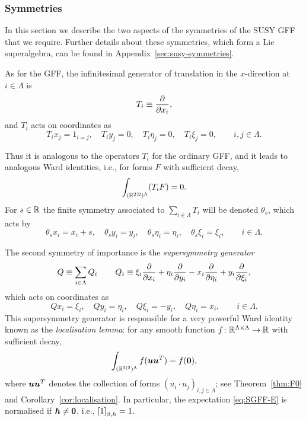 \documentclass[11pt,a4paper]{article}
\begin{document}
\subsubsection{Symmetries} 

In this section we describe the two aspects of the symmetries of the
SUSY GFF that we require. Further details about these symmetries,
which form a Lie superalgebra, can be found in
Appendix~\ref{sec:susy-symmetries}.

As for the GFF, the infinitesimal generator of translation in
the $x$-direction at $i\in\Lambda$ is
\begin{equation}
  T_i \equiv \frac{\partial }{\partial x_i},
\end{equation}
and $T_{i}$ acts on coordinates as
\begin{equation}
  T_ix_j = 1_{i = j},\quad T_iy_j = 0, \quad T_i\eta_j = 0,\quad
  T_i\xi_j = 0, \qquad i,j\in\Lambda.
\end{equation}

Thus it is analogous to the operators $T_i$ for the ordinary GFF, and
it leads to analogous Ward identities, i.e., for forms $F$ with
sufficient decay,
\begin{equation}
  \label{eq:IBP-SUSY-GFF}
  \int_{(\mathbb{R}^{2|2})^{\Lambda}} (T_{i}F) = 0.
\end{equation}
For $s\in \mathbb{R}$ the finite symmetry associated to
$\sum_{i\in\Lambda} T_i$ will be denoted $\theta_s$, which acts by
\begin{equation}
  \theta_s x_i = x_i+s,\quad\theta_s y_i = y_i, \quad \theta_s \eta_i = \eta_i,\quad \theta_s \xi_i = \xi_i,
  \qquad i\in\Lambda.
\end{equation}


The second symmetry of importance is the \emph{supersymmetry generator}
\begin{equation}\label{eq:susy-gen}
Q \equiv \sum_{i\in\Lambda} Q_i\, 
\qquad 
Q_i \equiv \xi_i \frac{\partial }{\partial x_i} + \eta_i \frac{\partial }{\partial y_i} - x_i\frac{\partial }{\partial \eta_i} + y_i \frac{\partial }{\partial \xi_i},
\end{equation}
which acts on coordinates as
\begin{equation}
  Qx_i = \xi_i, \quad Qy_i = \eta_i, \quad Q\xi_i = -y_i, \quad
  Q\eta_i = x_i, \qquad i\in\Lambda.
\end{equation}
This supersymmetry generator is responsible for a very powerful Ward
identity known as the \emph{localisation lemma}: for any smooth
function $f\colon \mathbb{R}^{\Lambda\times\Lambda} \to \mathbb{R}$ with sufficient
decay,
\begin{equation} \label{e:localisation-bis}
  \int_{(\mathbb{R}^{2|2})^{\Lambda}} f(\boldsymbol{u}\boldsymbol{u}^T) = f(\boldsymbol{0}),
\end{equation}
where $\boldsymbol{u}\boldsymbol{u}^T$ denotes the collection of forms
$(u_i \cdot u_j)_{i,j\in\Lambda}$; see Theorem~\ref{thm:F0} and
Corollary~\ref{cor:localisation}.  In particular, the expectation
\eqref{eq:SGFF-E} is normalised if $\boldsymbol{h}\neq\boldsymbol{0}$, i.e.,
$\uspin{1}_{\beta,h}=1$.
\end{document}
